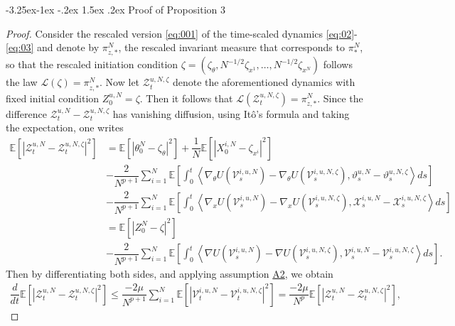 \documentclass[a4paper, 10pt]{article}
\makeatletter
\theoremstyle{plain}%
\renewcommand\subsubsection{\@startsection{subsubsection}{3}{\z@}%
  {-3.25ex\@plus -1ex \@minus -.2ex}%
  {1.5ex \@plus .2ex}%
  {\normalfont\small\itshape\mdseries}}
\makeatother
\begin{document}
\subsubsection{Proof of Proposition 3}\label{Proof3}
\begin{proof}
    Consider the rescaled version \eqref{eq:001} of the time-scaled dynamics \eqref{eq:02}-\eqref{eq:03} and denote by $\pi^N_{z,*}$, the rescaled invariant measure that corresponds to $\pi^N_*$, so that the rescaled initiation condition $\zeta=(\zeta_\theta,N^{-1/2}\zeta_{x^1},\ldots,N^{-1/2}\zeta_{x^N})$ follows the law $\mathcal{L}(\zeta)=\pi^N_{z,*}$. Now let $\mathcal{Z}_t^{u,N,\zeta}$ denote the aforementioned dynamics with fixed initial condition $Z_0^{u,N}=\zeta$. Then it follows that $\mathcal{L}(\mathcal{Z}_t^{u,N,\zeta})=\pi^N_{z,*}$. Since the difference $ \mathcal{Z}_t^{u,N}-\mathcal{Z}_t^{u,N,\zeta}$ has vanishing diffusion, using It\^o's formula and taking the expectation, one writes
    \begin{align*}
        \mathbb{E}\left[|\mathcal{Z}_t^{u,N}-\mathcal{Z}_t^{u,N,\zeta}|^2\right]&=\mathbb{E}\left[|\theta_0^N-\zeta_{\theta}|^2\right]+\dfrac{1}{N}\mathbb{E}\left[|X_0^{i,N}-\zeta_{x^i}|^2\right]\\&-\dfrac{2}{N^{p+1}}\sum_{i=1}^N\mathbb{E}\left[\int_0^t \left\langle \nabla_{\theta}U(\mathcal{V}_s^{i,u,N})-\nabla_{\theta}U(\mathcal{V}_s^{i,u,N,\zeta}),\vartheta_s^{u,N}-\vartheta_s^{u,N,\zeta} \right\rangle ds\right]\\&-\dfrac{2}{N^{p+1}}\sum_{i=1}^N\mathbb{E}\left[\int_0^t \left\langle \nabla_{x}U(\mathcal{V}_s^{i,u,N})-\nabla_{x}U(\mathcal{V}_s^{i,u,N,\zeta}),\mathcal{X}_s^{i,u,N}-\mathcal{X}_s^{i,u,N,\zeta} \right\rangle ds\right]\\
        &=\mathbb{E}\left[|Z_0^N-\zeta|^2\right]\\
        &-\dfrac{2}{N^{p+1}}\sum_{i=1}^N\mathbb{E}\left[\int_0^t \left\langle \nabla U(\mathcal{V}_s^{i,u,N})-\nabla U(\mathcal{V}_s^{i,u,N,\zeta}),\mathcal{V}_s^{i,u,N}-\mathcal{V}_s^{i,u,N,\zeta} \right\rangle ds\right].
        \end{align*}
    Then by differentiating both sides, and applying assumption \hyperlink{Assum2}{A2}, we obtain
    \begin{align*}
        \dfrac{d}{dt}\mathbb{E}\left[|\mathcal{Z}_t^{u,N}-\mathcal{Z}_t^{u,N,\zeta}|^2\right]\leq\dfrac{-2\mu}{N^{p+1}}\sum_{i=1}^N\mathbb{E}\left[|\mathcal{V}_t^{i,u,N}-\mathcal{V}_t^{i,u,N,\zeta}|^2\right]=\dfrac{-2\mu}{N^p}\mathbb{E}\left[|\mathcal{Z}_t^{u,N}-\mathcal{Z}_t^{u,N,\zeta}|^2\right],

\end{align*}
\end{proof}
\end{document}
